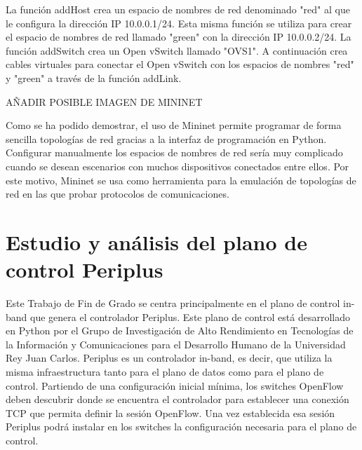\documentclass[a4paper, 12pt]{book}
\begin{document}
	La función addHost crea un espacio de nombres de red denominado "red" al que le configura
	la dirección IP 10.0.0.1/24. Esta misma función se utiliza para crear el espacio de nombres de
	red llamado "green" con la dirección IP 10.0.0.2/24.
	La función addSwitch crea un Open vSwitch llamado "OVS1". A continuación crea cables virtuales
	para conectar el Open vSwitch con los espacios de nombres "red" y "green" a través de la función
	addLink.
	
	AÑADIR POSIBLE IMAGEN DE MININET
	
	Como se ha podido demostrar, el uso de Mininet permite programar de forma sencilla
	topologías de red gracias a la interfaz de programación en Python. Configurar manualmente
	los espacios de nombres de red sería muy complicado cuando se desean escenarios con
	muchos dispositivos conectados entre ellos. Por este motivo, Mininet se usa como herramienta
	para la emulación de topologías de red en las que probar protocolos de comunicaciones.
	
	
	
	\cleardoublepage %
	\chapter{Estudio y análisis del plano de control Periplus} %
	\label{chap:periplus} %
	
	Este Trabajo de Fin de Grado se centra principalmente en el plano de control in-band que genera el controlador Periplus. Este plano de control está desarrollado en Python por el Grupo de Investigación de Alto Rendimiento en Tecnologías de la Información y Comunicaciones para el Desarrollo Humano de la Universidad Rey Juan Carlos. Periplus es un controlador in-band, es decir, que utiliza la misma infraestructura tanto para el plano de datos como para el plano de control. Partiendo de una configuración inicial mínima, los switches OpenFlow deben descubrir donde
	se encuentra el controlador para establecer una conexión TCP que permita definir la sesión
	OpenFlow. Una vez establecida esa sesión Periplus podrá instalar en los switches la configuración
	necesaria para el plano de control.
	
\end{document}
